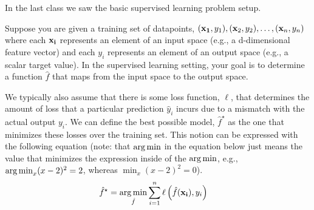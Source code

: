 \documentclass[assignment02_Solutions]{subfiles}
\begin{document}
\begin{recall}
In the last class we saw the basic supervised learning problem setup.

Suppose you are given a training set of datapoints, $(\mathbf{x_1}, y_1), (\mathbf{x}_2, y_2), \ldots, (\mathbf{x}_n, y_n)$ where each $\mathbf{x_i}$ represents an element of an input space (e.g., a d-dimensional feature vector) and each $y_i$ represents an element of an output space (e.g., a scalar target value).  In the supervised learning setting, your goal is to determine a function $\hat{f}$ that maps from the input space to the output space.

We typically also assume that there is some loss function, $\ell$, that determines the amount of loss that a particular prediction $\hat{y}_i$ incurs due to a mismatch with the actual output $y_i$.  We can define the best possible model, $\hat{f}^\star$ as the one that minimizes these losses over the training set.  This notion can be expressed with the following equation  (note: that $\operatorname*{arg\,min}$ in the equation below just means the value that minimizes the expression inside of the $\operatorname*{arg\,min}$, e.g., $\operatorname*{arg\,min}_{x} (x - 2)^2 = 2$, whereas $\min_{x} (x-2)^2 = 0$).
\begin{align}
\hat{f}^\star &= \operatorname*{arg\,min}_{\hat{f}} \sum_{i=1}^n \ell \left ( \hat{f}(\mathbf{x_i}), y_i \right )
\end{align} 

\end{recall}
\end{document}
